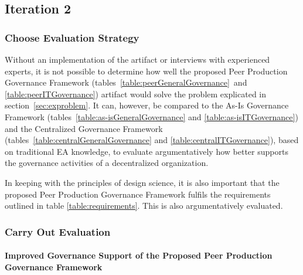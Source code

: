 

\subsection{Iteration 2}
\subsubsection*{Choose Evaluation Strategy}

Without an implementation of the artifact or interviews with experienced experts, it is not possible to determine how well the proposed Peer Production Governance Framework (tables~\ref{table:peerGeneralGovernance}\ and \ref{table:peerITGovernance}) artifact would solve the problem explicated in section~\ref{sec:exproblem}. It can, however, be compared to the As-Is Governance Framework (tables~\ref{table:as-isGeneralGovernance} and \ref{table:as-isITGovernance}) and the Centralized Governance Framework (tables~\ref{table:centralGeneralGovernance}  and \ref{table:centralITGovernance}), based on traditional EA knowledge, to evaluate argumentatively how better supports the governance activities of a decentralized organization.

In keeping with the principles of design science, it is also important that the proposed Peer Production Governance Framework fulfils the requirements outlined in table \ref{table:requirements}. This is also argumentatively evaluated. 

\subsubsection*{Carry Out Evaluation}

\paragraph*{Improved Governance Support of the Proposed Peer Production Governance Framework}

